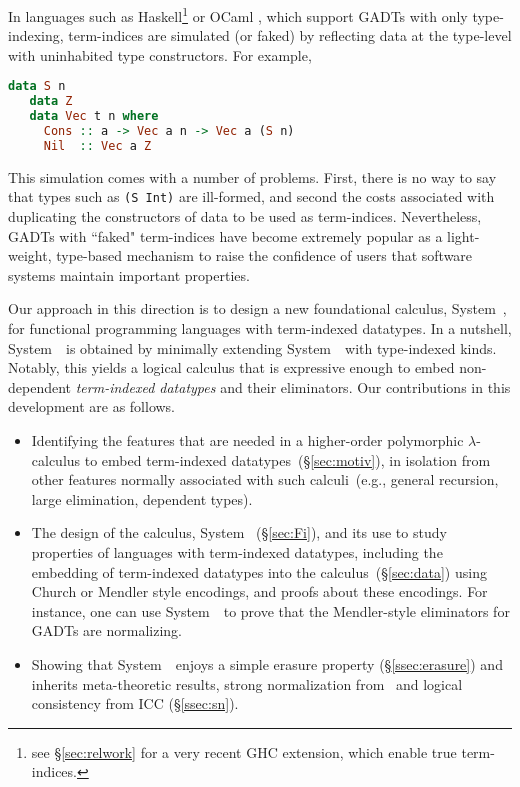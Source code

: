 In languages such as Haskell\footnote{see \S\ref{sec:relwork} for
        a very recent GHC extension, which enable true term-indices.}
        or OCaml \cite{GarNor11}, which support GADTs with only type-indexing,
term-indices are simulated (or faked) by reflecting data at the type-level
with uninhabited type constructors. For example,\vspace*{-2pt}
\begin{lstlisting}[basicstyle={\ttfamily\small},language=Haskell,mathescape]
   data S n
   data Z
   data Vec t n where
     Cons :: a -> Vec a n -> Vec a (S n)
     Nil  :: Vec a Z
\end{lstlisting}\vspace*{-2pt}
This simulation comes with a number of problems. First, there is no way to say
that types such as {\tt (S Int)} are ill-formed, and second the costs
associated with duplicating the constructors of data to be used
as term-indices.
Nevertheless, GADTs with ``faked" term-indices have become extremely popular
as a light-weight, type-based mechanism to raise the confidence of users
that software systems maintain important properties.

Our approach in this direction is to design a new foundational calculus,
System~\Fi, for functional programming languages with term-indexed
datatypes.  In a nutshell, System~\Fi\ is obtained by minimally extending
System~\Fw\ with type-indexed kinds.  Notably, this yields a logical
calculus that is expressive enough to embed non-dependent
\emph{term-indexed datatypes} and their eliminators. Our contributions in
this development are as follows.\vspace*{-.8ex}
\begin{itemize}
\item 
  Identifying the features that are needed in a higher-order polymorphic
  $\lambda$-calculus to embed term-indexed datatypes~(\S\ref{sec:motiv}),
  in isolation from other features normally associated with such
  calculi~(e.g., general recursion, large elimination, dependent types).
\item 
  The design of the calculus, System \Fi\ (\S\ref{sec:Fi}), and its use to
  study properties of languages with term-indexed datatypes, including
  the embedding of
  term-indexed datatypes into the calculus~(\S\ref{sec:data}) using
  Church or Mendler style encodings, and  proofs about these encodings.
  For instance, one can use System~\Fi\ to prove that
  the Mendler-style eliminators for GADTs
  \cite{AhnShe11} are normalizing.
\item 
  Showing that System~\Fi\ enjoys a simple erasure
  property (\S\ref{ssec:erasure}) 
  and inherits meta-theoretic
  results, strong normalization from \Fw\  and logical consistency from
  ICC (\S\ref{ssec:sn}).
\end{itemize}\vspace*{-3pt}

